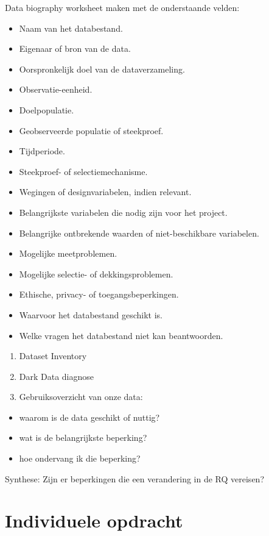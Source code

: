 \documentclass[
  letterpaper,
  DIV=11,
  numbers=noendperiod]{scrreprt}
\providecommand{\tightlist}{%
  \setlength{\itemsep}{0pt}\setlength{\parskip}{0pt}}
\begin{document}
Data biography worksheet maken met de onderstaande velden:

\begin{itemize}
\tightlist
\item
  Naam van het databestand.
\item
  Eigenaar of bron van de data.
\item
  Oorspronkelijk doel van de dataverzameling.
\item
  Observatie-eenheid.
\item
  Doelpopulatie.
\item
  Geobserveerde populatie of steekproef.
\item
  Tijdperiode.
\item
  Steekproef- of selectiemechanisme.
\item
  Wegingen of designvariabelen, indien relevant.
\item
  Belangrijkste variabelen die nodig zijn voor het project.
\item
  Belangrijke ontbrekende waarden of niet-beschikbare variabelen.
\item
  Mogelijke meetproblemen.
\item
  Mogelijke selectie- of dekkingsproblemen.
\item
  Ethische, privacy- of toegangsbeperkingen.
\item
  Waarvoor het databestand geschikt is.
\item
  Welke vragen het databestand niet kan beantwoorden.
\end{itemize}

\begin{enumerate}
\def\labelenumi{\arabic{enumi}.}
\tightlist
\item
  Dataset Inventory
\item
  Dark Data diagnose
\item
  Gebruiksoverzicht van onze data:
\end{enumerate}

\begin{itemize}
\tightlist
\item
  waarom is de data geschikt of nuttig?
\item
  wat is de belangrijkste beperking?
\item
  hoe ondervang ik die beperking?
\end{itemize}

Synthese: Zijn er beperkingen die een verandering in de RQ vereisen?

\section{Individuele opdracht}\label{individuele-opdracht-2}
\end{document}
